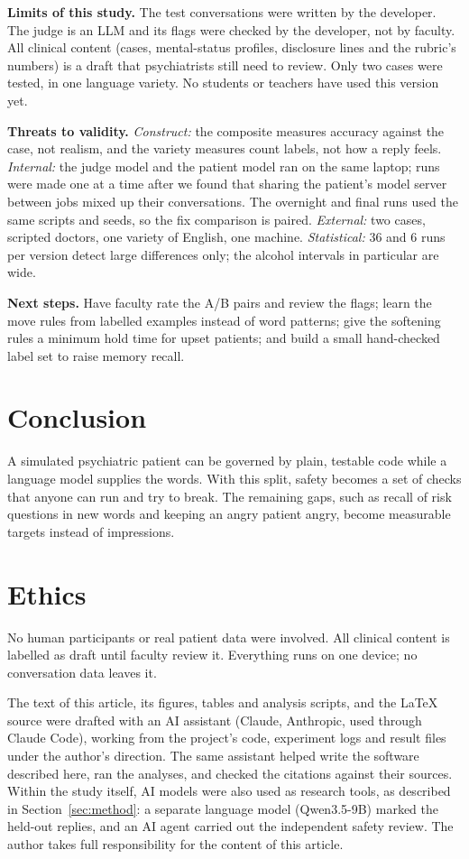 \documentclass[manuscript, screen, review]{jair}
\begin{document}
\textbf{Limits of this study.} The test conversations were written by the developer. The judge is an LLM and its flags were checked by the
developer, not by faculty. All clinical content (cases, mental-status profiles, disclosure lines and the rubric's numbers) is a draft that
psychiatrists still need to review. Only two cases were tested, in one language variety. No students or teachers have used this version yet.

\textbf{Threats to validity.} \emph{Construct:} the composite measures accuracy against the case, not realism, and the variety measures
count labels, not how a reply feels. \emph{Internal:} the judge model and the patient model ran on the same laptop; runs were made one at a
time after we found that sharing the patient's model server between jobs mixed up their conversations. The overnight and final runs used the
same scripts and seeds, so the fix comparison is paired. \emph{External:} two cases, scripted doctors, one variety of English, one machine.
\emph{Statistical:} 36 and 6 runs per version detect large differences only; the alcohol intervals in particular are wide.

\textbf{Next steps.} Have faculty rate the A/B pairs and review the flags; learn the move rules from labelled examples instead of word patterns;
give the softening rules a minimum hold time for upset patients; and build a small hand-checked label set to raise memory recall.

\section{Conclusion}
A simulated psychiatric patient can be governed by plain, testable code while a language model supplies the words. With this split, safety becomes a set of checks that anyone can run and try to break. The remaining gaps, such as recall of risk questions in new words and keeping an angry patient angry, become measurable targets instead of impressions.

\section*{Ethics}
No human participants or real patient data were involved. All clinical content is labelled as draft until faculty review it. Everything runs on
one device; no conversation data leaves it.

\begin{acks}
The text of this article, its figures, tables and analysis scripts, and the \LaTeX{} source were
drafted with an AI assistant (Claude, Anthropic, used through Claude Code), working from the project's code, experiment logs and result
files under the author's direction. The same assistant helped write the software described here, ran the analyses, and checked the
citations against their sources. Within the study itself, AI models were also used as research tools, as described in Section~\ref{sec:method}: a separate language model (Qwen3.5-9B) marked the held-out replies, and an AI agent carried out the independent safety review. The author takes full responsibility for the content of this article.
\end{acks}
\end{document}
